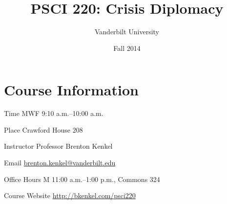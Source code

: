\documentclass[nohyper]{tufte-handout}
\title{PSCI 220: Crisis Diplomacy}
\author{Vanderbilt University}
\date{Fall 2014}
\begin{document}
\maketitle

\section{Course Information}

\begin{compactdesc}
  \item[Time] MWF 9:10 a.m.--10:00 a.m.
  \item[Place] Crawford House 208
  \item[Instructor] Professor Brenton Kenkel
  \begin{compactdesc}
    \item[Email] \href{mailto:brenton.kenkel@vanderbilt.edu}{brenton.kenkel@vanderbilt.edu}
    \item[Office Hours] M 11:00 a.m.--1:00 p.m., Commons 324
  \end{compactdesc}
  \item[Course Website] \url{http://bkenkel.com/psci220}
\end{compactdesc}


\end{document}
